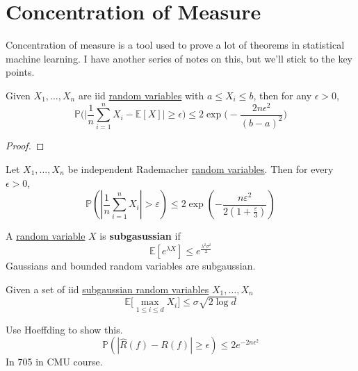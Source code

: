 \section{Concentration of Measure}

  Concentration of measure is a tool used to prove a lot of theorems in statistical machine learning. I have another series of notes on this, but we'll stick to the key points. 

  \begin{theorem}
    \label{thm:hoeffdings-inequality}
    Given $X_1, \ldots, X_n$ are iid \hyperref[prob-def:random-variable]{random variables} with $a \leq X_i \leq b$, then for any $\epsilon > 0$, 
    \begin{equation}
      \mathbb{P} \bigg( \bigg| \frac{1}{n} \sum_{i=1}^n X_i - \mathbb{E}[X] \bigg| \geq \epsilon \bigg) \leq 2 \exp \bigg( - \frac{2 n \epsilon^2}{(b - a)^2} \bigg)
    \end{equation}
  \end{theorem}
  \begin{proof}
    
  \end{proof}

  \begin{theorem}
    \label{thm:bernsteins-inequality}
    Let $X_1, \ldots, X_n$ be independent Rademacher \hyperref[prob-def:random-variable]{random variables}. Then for every $\epsilon > 0$, 
    \begin{equation}
      \mathbb{P}\left(\left|\frac{1}{n}\sum_{i=1}^{n}X_i\right| > \varepsilon\right) \leq 2\exp\left(-\frac{n\varepsilon^2}{2(1+\frac{\varepsilon}{3})}\right)
    \end{equation} 
  \end{theorem}

  \begin{definition}
    \label{def:subgaussian-random-variables}
    A \hyperref[prob-def:random-variable]{random variable} $X$ is \textbf{subgasussian} if 
    \begin{equation}
      \mathbb{E}[e^{\lambda X}] \leq e^{\frac{\lambda^2 \sigma^2}{2}}
    \end{equation}
    Gaussians and bounded random variables are subgaussian.
  \end{definition}

  \begin{lemma}
    \label{thm:subgaussian_bound}
    Given a set of iid \hyperref[def:subgaussian-random-variables]{subgaussian random variables} $X_1, \ldots, X_n$ 
    \begin{equation}
      \mathbb{E}\big[ \max_{1 \leq i \leq d} X_i \big] \leq \sigma \sqrt{2 \log d}
    \end{equation}
  \end{lemma}


  Use Hoeffding to show this. 
  \begin{equation}
    \mathbb{P} (|\hat{R} (f) - R(f)| \geq \epsilon) \leq 2e^{- 2 n \epsilon^2}
  \end{equation}
  In 705 in CMU course. 

